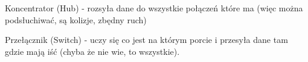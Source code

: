 \documentclass[../main.tex]{subfiles}
\begin{document}
    Koncentrator (Hub) - rozsyła dane do wszystkie połączeń które ma (więc można podsłuchiwać, są kolizje, zbędny ruch)

    Przełącznik (Switch) - uczy się co jest na którym porcie i przesyła dane tam gdzie mają iść (chyba że nie wie, to wszystkie).
\end{document}
